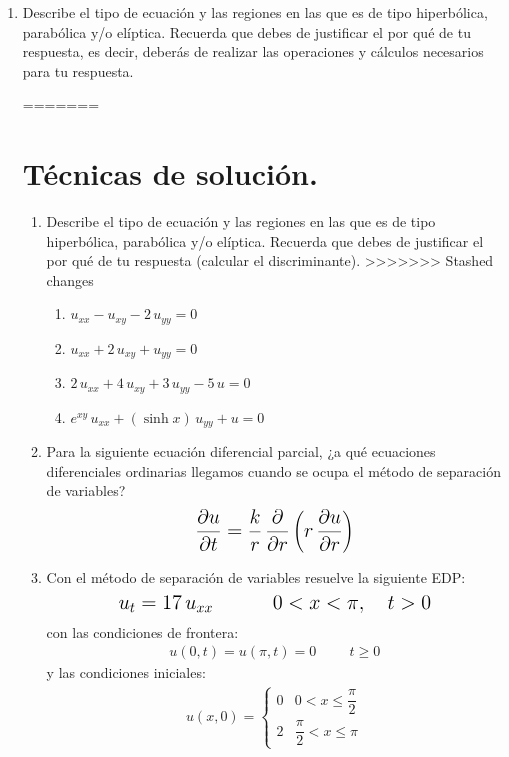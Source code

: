 \begin{enumerate}
\item Describe el tipo de ecuación y las regiones en las que es de tipo hiperbólica, parabólica y/o elíptica. Recuerda que debes de justificar el por qué de tu respuesta, es decir, deberás de realizar las operaciones y cálculos necesarios para tu respuesta.

=======
\newpage
\section{Técnicas de solución.}

\begin{enumerate}
\item Describe el tipo de ecuación y las regiones en las que es de tipo hiperbólica, parabólica y/o elíptica. Recuerda que debes de justificar el por qué de tu respuesta (calcular el discriminante).
>>>>>>> Stashed changes
\begin{enumerate}
\Large
\item $u_{xx} - u_{xy} - 2 \, u_{yy} = 0$
\item $u_{xx} + 2 \, u_{xy} + u_{yy} = 0$
\item $2 \, u_{xx} + 4 \, u_{xy} + 3 \, u_{yy} - 5 \, u = 0$
\item $e^{x y} \, u_{xx} + (\sinh x) \, u_{yy} + u = 0$
\end{enumerate}
\item Para la siguiente ecuación diferencial parcial, ¿a qué ecuaciones diferenciales ordinarias llegamos cuando se ocupa el método de separación de variables?
\begin{align*}
\mbox{\Large $ \displaystyle
\pdv{u}{t} = \dfrac{k}{r} \, \pdv{r} \left( r \, \pdv{u}{r} \right)$}
\end{align*}
\item Con el método de separación de variables resuelve la siguiente EDP:
\begin{align*}
\mbox{\Large $u_{t} = 17 \, u_{xx} \hspace{1.5cm} 0 < x < \pi, \hspace{0.5cm} t > 0 $}
\end{align*}
con las condiciones de frontera:
\begin{align*}
u(0,t) = u(\pi, t) = 0 \hspace{1cm} t \geq 0
\end{align*}
y las condiciones iniciales:
\begin{align*}
u(x, 0) = \begin{cases}
0 & 0 < x \leq \dfrac{\pi}{2} \\
2 & \dfrac{\pi}{2} < x \leq \pi
\end{cases}
\end{align*}


\end{enumerate}
\end{enumerate}
